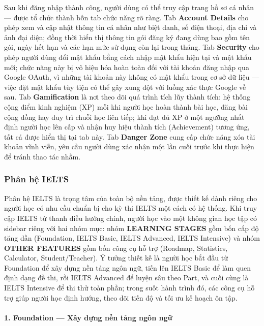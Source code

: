 Sau khi đăng nhập thành công, người dùng có thể truy cập trang hồ sơ cá nhân --- được tổ chức thành bốn tab chức năng rõ ràng. Tab \textbf{Account Details} cho phép xem và cập nhật thông tin cá nhân như biệt danh, số điện thoại, địa chỉ và ảnh đại diện; đồng thời hiển thị thông tin gói đăng ký đang dùng bao gồm tên gói, ngày hết hạn và các hạn mức sử dụng còn lại trong tháng. Tab \textbf{Security} cho phép người dùng đổi mật khẩu bằng cách nhập mật khẩu hiện tại và mật khẩu mới; chức năng này bị vô hiệu hóa hoàn toàn đối với tài khoản đăng nhập qua Google OAuth, vì những tài khoản này không có mật khẩu trong cơ sở dữ liệu --- việc đặt mật khẩu tùy tiện có thể gây xung đột với luồng xác thực Google về sau. Tab \textbf{Gamification} là nơi theo dõi quá trình tích lũy thành tích: hệ thống cộng điểm kinh nghiệm (XP) mỗi khi người học hoàn thành bài học, đăng bài cộng đồng hay duy trì chuỗi học liên tiếp; khi đạt đủ XP ở một ngưỡng nhất định người học lên cấp và nhận huy hiệu thành tích (Achievement) tương ứng, tất cả được hiển thị tại tab này. Tab \textbf{Danger Zone} cung cấp chức năng xóa tài khoản vĩnh viễn, yêu cầu người dùng xác nhận một lần cuối trước khi thực hiện để tránh thao tác nhầm.

\subsubsection{Phân hệ IELTS}

Phân hệ IELTS là trọng tâm của toàn bộ nền tảng, được thiết kế dành riêng cho người học có nhu cầu chuẩn bị cho kỳ thi IELTS một cách có hệ thống. Khi truy cập IELTS từ thanh điều hướng chính, người học vào một không gian học tập có sidebar riêng với hai nhóm mục: nhóm \textbf{LEARNING STAGES} gồm bốn cấp độ tăng dần (Foundation, IELTS Basic, IELTS Advanced, IELTS Intensive) và nhóm \textbf{OTHER FEATURES} gồm bốn công cụ hỗ trợ (Roadmap, Statistics, Calculator, Student/Teacher). Ý tưởng thiết kế là người học bắt đầu từ Foundation để xây dựng nền tảng ngôn ngữ, tiến lên IELTS Basic để làm quen định dạng đề thi, rồi IELTS Advanced để luyện sâu theo Part, và cuối cùng là IELTS Intensive để thi thử toàn phần; trong suốt hành trình đó, các công cụ hỗ trợ giúp người học định hướng, theo dõi tiến độ và tối ưu kế hoạch ôn tập.

\paragraph{1. Foundation --- Xây dựng nền tảng ngôn ngữ}

